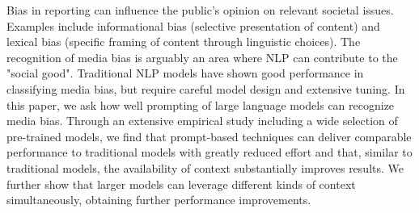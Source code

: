 Bias in  reporting can influence the public's opinion on relevant societal issues. Examples include informational bias (selective presentation of content) and lexical bias (specific framing of content through linguistic choices). The recognition of media bias is arguably an area where NLP can contribute to the "social good". Traditional NLP models have shown good performance in classifying media bias, but  require careful model design and extensive tuning. In this paper, we ask how well prompting of large language models can recognize media bias. Through an extensive empirical study including a wide selection of pre-trained models, we find that prompt-based techniques can deliver comparable performance to traditional models with greatly reduced effort and that, similar to traditional models, the availability of context substantially improves results. We further show that larger models can leverage different kinds of context simultaneously, obtaining further performance improvements.